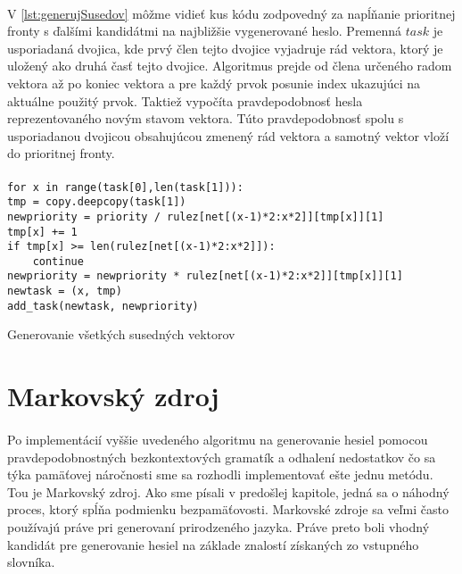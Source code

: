 \paragraph{}
V \ref{lst:generujSusedov} môžme vidieť kus kódu zodpovedný za napĺňanie prioritnej fronty s ďalšími kandidátmi na najbližšie vygenerované heslo. Premenná \(task\) je usporiadaná dvojica, kde prvý člen tejto dvojice vyjadruje rád vektora, ktorý je uložený ako druhá časť tejto dvojice. Algoritmus prejde od člena určeného radom vektora až po koniec vektora a pre každý prvok posunie index ukazujúci na aktuálne použitý prvok. Taktiež vypočíta pravdepodobnosť hesla reprezentovaného novým stavom vektora. Túto pravdepodobnosť spolu s usporiadanou dvojicou obsahujúcou zmenený rád vektora a samotný vektor vloží do prioritnej fronty.

\paragraph{}
\begin{listing}
\begin{verbatim}
for x in range(task[0],len(task[1])):
tmp = copy.deepcopy(task[1])
newpriority = priority / rulez[net[(x-1)*2:x*2]][tmp[x]][1]
tmp[x] += 1
if tmp[x] >= len(rulez[net[(x-1)*2:x*2]]):
	continue
newpriority = newpriority * rulez[net[(x-1)*2:x*2]][tmp[x]][1]
newtask = (x, tmp)
add_task(newtask, newpriority)
\end{verbatim}
\caption{Generovanie všetkých susedných vektorov}
\label{lst:generujSusedov}
\end{listing}

\section{Markovský zdroj}
\paragraph{}
Po implementácií vyššie uvedeného algoritmu na generovanie hesiel pomocou pravdepodobnostných bezkontextových gramatík a odhalení nedostatkov čo sa týka pamäťovej náročnosti sme sa rozhodli implementovať ešte jednu metódu. Tou je Markovský zdroj. Ako sme písali v predošlej kapitole, jedná sa o náhodný proces, ktorý spĺňa podmienku bezpamäťovosti. Markovské zdroje sa veľmi často používajú práve pri generovaní prirodzeného jazyka. Práve preto boli vhodný kandidát pre generovanie hesiel na základe znalostí získaných zo vstupného slovníka. 

